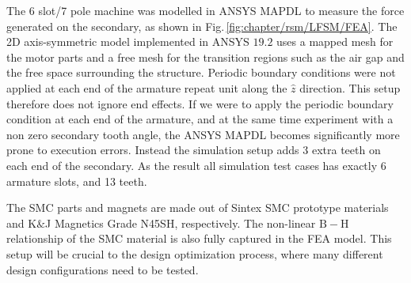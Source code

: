             The 6 slot/7 pole machine was modelled in ANSYS MAPDL to measure the force generated on the secondary, as shown in Fig.\,\ref{fig:chapter/rsm/LFSM/FEA}. The 2D axis-symmetric model implemented in ANSYS  $19.2$ uses a mapped mesh for the motor parts and a free mesh for the transition regions such as the air gap and the free space surrounding the structure. Periodic boundary conditions were not applied at each end of the armature repeat unit along the $\hat{z}$ direction. This setup therefore does not ignore end effects. If we were to apply the periodic boundary condition at each end of the armature, and at the same time experiment with a non zero secondary tooth angle, the ANSYS MAPDL becomes significantly more prone to execution errors. Instead the simulation setup adds 3 extra teeth on each end of the secondary. As the result all simulation test cases has exactly 6 armature slots, and 13 teeth.
            

            The \acs{SMC} parts and magnets are made out of Sintex \acs{SMC} prototype materials and K$\&$J Magnetics Grade N45SH, respectively. The non-linear $\mathrm{B-H}$ relationship of the \acs{SMC} material is also fully captured in the FEA model. This setup will be crucial to the design optimization process, where many different design configurations need to be tested.
            
